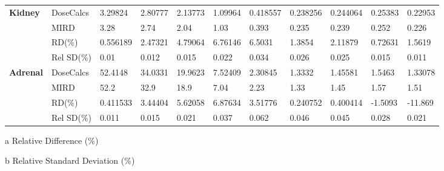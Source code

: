 \documentclass[letterpaper,12pt]{article}
\begin{document}
\begin{table}[H]
\begin{adjustbox}{width=\columnwidth,center}
\begin{threeparttable}
\begin{tabular}{lllllllllll}
\multirow{4}{*}{\textbf{Kidney}}       & DoseCalcs                                         & 3.29824        & 2.80777        & 2.13773        & 1.09964        & 0.418557        & 0.238256        & 0.244064        & 0.25383        & 0.22953        \\ 
                             & MIRD                                        & 3.28        & 2.74        & 2.04        & 1.03        & 0.393        & 0.235        & 0.239        & 0.252        & 0.226        \\ 
                             & RD(\%)\tnote{a}                                         & 0.556189        & 2.47321        & 4.79064        & 6.76146        & 6.5031        & 1.3854        & 2.11879        & 0.72631        & 1.5619        \\ 
                             & Rel SD(\%)\tnote{b}                                          & 0.01        & 0.012        & 0.015        & 0.022        & 0.034        & 0.026        & 0.025        & 0.015        & 0.011               \\\hline 
\multirow{4}{*}{\textbf{Adrenal}}       & DoseCalcs                                         & 52.4148        & 34.0331        & 19.9623        & 7.52409        & 2.30845        & 1.3332        & 1.45581        & 1.5463        & 1.33078        \\ 
                             & MIRD                                        & 52.2        & 32.9        & 18.9        & 7.04        & 2.23        & 1.33        & 1.45        & 1.57        & 1.51        \\ 
                             & RD(\%)\tnote{a}                                         & 0.411533        & 3.44404        & 5.62058        & 6.87634        & 3.51776        & 0.240752        & 0.400414        & -1.5093        & -11.869        \\ 
                             & Rel SD(\%)\tnote{b}                                          & 0.011        & 0.015        & 0.021        & 0.037        & 0.062        & 0.046        & 0.045        & 0.028        & 0.021        \\ \hline
\end{tabular} 
\begin{tablenotes}\footnotesize
\item[a] Relative Difference (\%)
\item[b] Relative Standard Deviation (\%)
\end{tablenotes}
\end{threeparttable}
\end{adjustbox}
\label{SelfIrr}
\end{table}
\end{document}
